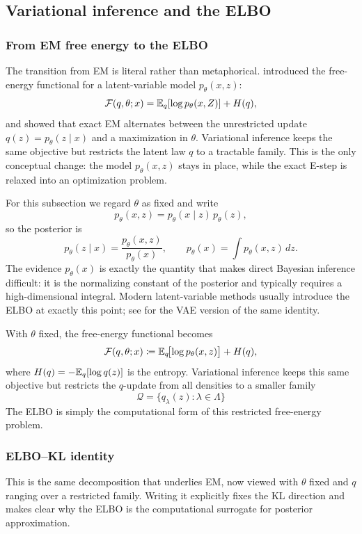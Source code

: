 \subsection{Variational inference and the ELBO}
\label{subsec:vi-elbo}

\subsubsection{From EM free energy to the ELBO}

The transition from EM is literal rather than metaphorical.
 introduced the free-energy functional for a latent-variable model \(p_\theta(x,z)\):
\[
  \mathcal{F}(q,\theta;x)
  =
  \mathbb{E}_q[\log p_\theta(x,Z)] + H(q),
\]
and showed that exact EM alternates between the unrestricted update \(q(z)=p_\theta(z\mid x)\) and a maximization in \(\theta\).
Variational inference keeps the same objective but restricts the latent law \(q\) to a tractable family.
This is the only conceptual change: the model \(p_\theta(x,z)\) stays in place, while the exact E-step is relaxed into an optimization problem.

For this subsection we regard \(\theta\) as fixed and write
\[
  p_\theta(x,z) = p_\theta(x\mid z)\,p_\theta(z),
\]
so the posterior is
\[
  p_\theta(z\mid x) = \frac{p_\theta(x,z)}{p_\theta(x)},
  \qquad
  p_\theta(x) = \int p_\theta(x,z)\,dz.
\]
The evidence \(p_\theta(x)\) is exactly the quantity that makes direct Bayesian inference difficult:
it is the normalizing constant of the posterior and typically requires a high-dimensional integral.
Modern latent-variable methods usually introduce the ELBO at exactly this point; see \citet[\S2.2]{kingma_welling_2014_aevb} for the VAE version of the same identity.

With \(\theta\) fixed, the free-energy functional becomes
\[
  \mathcal{F}(q,\theta;x)
  \coloneqq
  \mathbb{E}_q\!\bigl[\log p_\theta(x,z)\bigr]
  +
  H(q),
\]
where $H(q)=-\mathbb{E}_q[\log q(z)]$ is the entropy.
Variational inference keeps this same objective but restricts the $q$-update from all densities to a smaller family
\[
  \mathcal{Q} = \{q_\lambda(z): \lambda\in\Lambda\}
\]
The ELBO is simply the computational form of this restricted free-energy problem.

\subsubsection{ELBO--KL identity}

This is the same decomposition that underlies EM, now viewed with \(\theta\) fixed and \(q\) ranging over a
restricted family. Writing it explicitly fixes the KL direction and makes clear why the ELBO is the
computational surrogate for posterior approximation.

